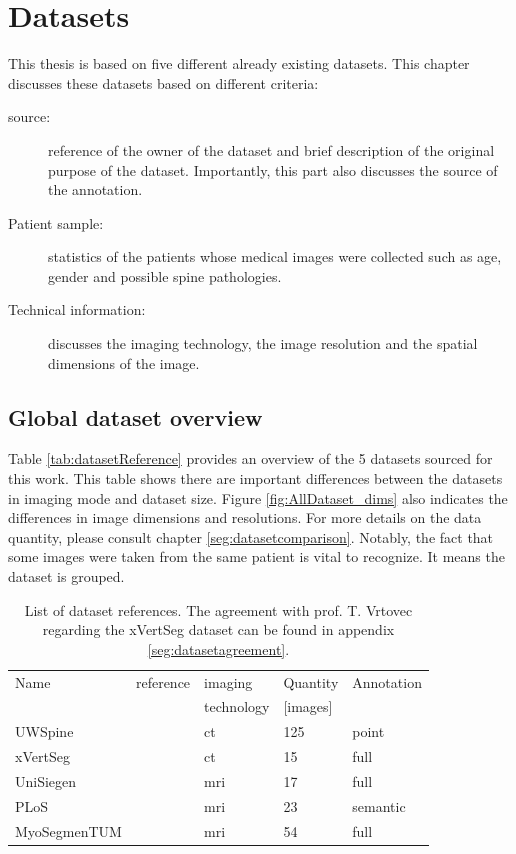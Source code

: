 \chapter{Datasets\label{sec:datasets}}

This thesis is based on five different already existing datasets.
This chapter discusses these datasets based on different criteria:

\begin{description}
    \item[source:] reference of the owner of the dataset and brief description of the original purpose of the dataset. Importantly, this part also discusses the source of the annotation.
    \item[Patient sample:] statistics of the patients whose medical images were collected such as age, gender and possible spine pathologies.
    \item[Technical information:] discusses the imaging technology, the image resolution and the spatial dimensions of the image. 
\end{description}

\section{Global dataset overview}

Table \ref{tab:datasetReference} provides an overview of the 5 datasets sourced for this work.
This table shows there are important differences between the datasets in imaging mode and dataset size.
Figure \ref{fig:AllDataset_dims} also indicates the differences in image dimensions and resolutions.
For more details on the data quantity, please consult chapter \ref{seg:datasetcomparison}. 
Notably, the fact that some images were taken from the same patient is vital to recognize. It means the dataset is grouped. 


\begin{table}
 
    \begin{tabular}{ l l l l l} 
     \hline
     \hline
     Name & reference & imaging & Quantity & Annotation \\
          &           & technology & [images] & \\
     \hline 
    UWSpine & \cite{Glocker}  & \acrshort{ct} & 125 & point  \\ 
    xVertSeg & \cite{Ibragimov2014, Korez2015} & \acrshort{ct} & 15 & full \\
    UniSiegen  & \cite{Zukic2014} & \acrshort{mri} & 17 & full \\
    PLoS & \cite{Chu2015} & \acrshort{mri} & 23 & semantic \\
    MyoSegmenTUM & \cite{Burian2019} & \acrshort{mri} &  54 & full \\
     \hline
     \hline
    \end{tabular}
    \caption{List of dataset references. 
    The agreement with prof. T. Vrtovec regarding the xVertSeg dataset can be found in appendix \ref{seg:datasetagreement}.\label{tab:datasetReferences}}

\end{table}

